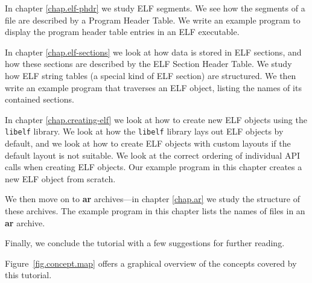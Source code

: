\documentclass[a4paper,pdftex]{book}
\newcommand{\library}[1]{\texttt{#1}}
\newcommand{\tool}[1]{\textbf{#1}}
\newcommand{\elfdatastructure}[1]{\textsf{#1}}
\begin{document}
In chapter \vref{chap.elf-phdr} we study ELF segments. We see how the
segments of a file are described by a \elfdatastructure{Prog\-ram
  Head\-er Table}. We write an example
program to display the program header table entries in an ELF
executable.

In chapter \vref{chap.elf-sections} we look at how data is stored in
ELF sections, and how these sections are described by the ELF
\elfdatastructure{Section Header Table}.
We study how ELF string tables (a special kind of ELF section) are
structured. We then write an example program that traverses an ELF
object, listing the names of its contained sections.

In chapter \vref{chap.creating-elf} we look at how to create new ELF
objects using the \library{libelf} library. We look at how the
\library{libelf} library lays out ELF objects by default, and we look
at how to create ELF objects with custom layouts if the default layout
is not suitable. We look at the correct ordering of individual API
calls when creating ELF objects. Our example program in this chapter
creates a new ELF object from scratch.

We then move on to \tool{ar} archives---in chapter \vref{chap.ar} we
study the structure of these archives. The example program in this
chapter lists the names of files in an \tool{ar} archive.

Finally, we conclude the tutorial with a few suggestions for further
reading.

Figure~\vref{fig.concept.map} offers a graphical overview of the
concepts covered by this tutorial.
\end{document}
